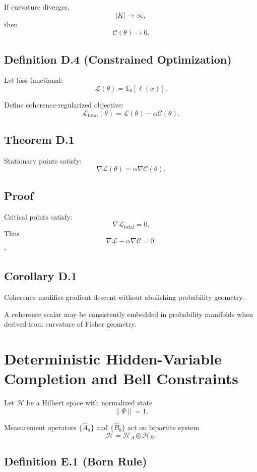 \documentclass[12pt]{article}
\begin{document}
If curvature diverges,
\[
|K| \to \infty,
\]
then
\[
\mathcal{C}(\theta) \to 0.
\]

\subsection*{Definition D.4 (Constrained Optimization)}

Let loss functional:
\[
\mathcal{L}(\theta)
=
\mathbb{E}_{\theta}[\ell(x)].
\]

Define coherence-regularized objective:
\[
\mathcal{L}_{\text{total}}(\theta)
=
\mathcal{L}(\theta)
-
\alpha \mathcal{C}(\theta).
\]

\subsection*{Theorem D.1}

Stationary points satisfy:
\[
\nabla \mathcal{L}(\theta)
=
\alpha \nabla \mathcal{C}(\theta).
\]

\subsection*{Proof}

Critical points satisfy:
\[
\nabla \mathcal{L}_{\text{total}} = 0.
\]
Thus
\[
\nabla \mathcal{L}
-
\alpha \nabla \mathcal{C}
=
0.
\]
\hfill $\square$

\subsection*{Corollary D.1}

Coherence modifies gradient descent without abolishing probability geometry.

A coherence scalar may be consistently embedded in probability manifolds when derived from curvature of Fisher geometry.

\section{Deterministic Hidden-Variable Completion and Bell Constraints}

Let $\mathcal{H}$ be a Hilbert space with normalized state
\[
\|\Psi\| = 1.
\]

Measurement operators $\{ \hat{A}_a \}$ and $\{ \hat{B}_b \}$ act on bipartite system
\[
\mathcal{H} = \mathcal{H}_A \otimes \mathcal{H}_B.
\]

\subsection*{Definition E.1 (Born Rule)}
\end{document}
